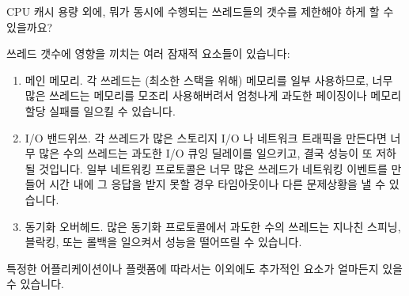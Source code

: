 \QuickQ{}
	CPU 캐시 용량 외에, 뭐가 동시에 수행되는 쓰레드들의 갯수를 제한해야
	하게 할 수 있을까요?

\QuickA{}
	쓰레드 갯수에 영향을 끼치는 여러 잠재적 요소들이 있습니다:
	\begin{enumerate}
	\item	메인 메모리. 각 쓰레드는 (최소한 스택을 위해) 메모리를 일부
		사용하므로, 너무 많은 쓰레드는 메모리를 모조리 사용해버려서
		엄청나게 과도한 페이징이나 메모리 할당 실패를 일으킬 수
		있습니다.
	\item	I/O 밴드위쓰. 각 쓰레드가 많은 스토리지 I/O 나 네트워크
		트래픽을 만든다면 너무 많은 수의 쓰레드는 과도한 I/O 큐잉
		딜레이를 일으키고, 결국 성능이 또 저하될 것입니다.
		일부 네트워킹 프로토콜은 너무 많은 쓰레드가 네트워킹 이벤트를
		만들어 시간 내에 그 응답을 받지 못할 경우 타임아웃이나 다른
		문제상황을 낼 수 있습니다.
	\item	동기화 오버헤드.
		많은 동기화 프로토콜에서 과도한 수의 쓰레드는 지나친 스피닝,
		블락킹, 또는 롤백을 일으켜서 성능을 떨어뜨릴 수 있습니다.
	\end{enumerate}

	특정한 어플리케이션이나 플랫폼에 따라서는 이외에도 추가적인 요소가
	얼마든지 있을 수 있습니다.

